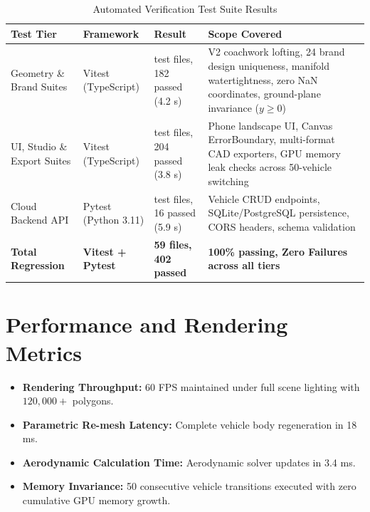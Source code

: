 \documentclass[12pt,a4paper]{report}
\begin{document}
\begin{table}[htbp]
\centering
\small
\caption{Automated Verification Test Suite Results}
\label{tab:test_results}
\renewcommand{\arraystretch}{1.3}
\begin{tabularx}{\textwidth}{|>{\raggedright\arraybackslash}p{2.6cm}|>{\raggedright\arraybackslash}p{2.2cm}|>{\raggedright\arraybackslash}p{2.8cm}|>{\raggedright\arraybackslash}X|}
\hline
\textbf{Test Tier} & \textbf{Framework} & \textbf{Result} & \textbf{Scope Covered} \\
\hline
Geometry \& Brand Suites & Vitest (TypeScript) & 23 test files, 182 passed (4.2 s) & V2 coachwork lofting, 24 brand design uniqueness, manifold watertightness, zero NaN coordinates, ground-plane invariance ($y \ge 0$) \\
\hline
UI, Studio \& Export Suites & Vitest (TypeScript) & 33 test files, 204 passed (3.8 s) & Phone landscape UI, Canvas ErrorBoundary, multi-format CAD exporters, GPU memory leak checks across 50-vehicle switching \\
\hline
Cloud Backend API & Pytest (Python 3.11) & 3 test files, 16 passed (5.9 s) & Vehicle CRUD endpoints, SQLite/PostgreSQL persistence, CORS headers, schema validation \\
\hline
\textbf{Total Regression} & \textbf{Vitest + Pytest} & \textbf{59 files, 402 passed} & \textbf{100\% passing, Zero Failures across all tiers} \\
\hline
\end{tabularx}
\end{table}

\section{Performance and Rendering Metrics}
\begin{itemize}
    \item \textbf{Rendering Throughput:} 60 FPS maintained under full scene lighting with $120,000+$ polygons.
    \item \textbf{Parametric Re-mesh Latency:} Complete vehicle body regeneration in 18 ms.
    \item \textbf{Aerodynamic Calculation Time:} Aerodynamic solver updates in 3.4 ms.
    \item \textbf{Memory Invariance:} 50 consecutive vehicle transitions executed with zero cumulative GPU memory growth.
\end{itemize}
\end{document}
